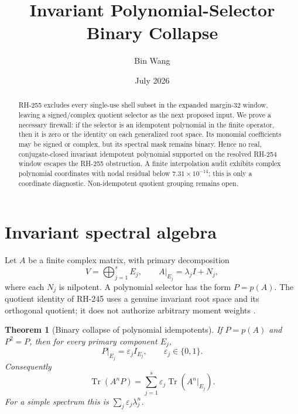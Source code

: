 \documentclass[11pt]{article}
\title{Invariant Polynomial-Selector Binary Collapse}
\author{Bin Wang}
\date{July 2026}
\newtheorem{theorem}{Theorem}[section]
\theoremstyle{remark}
\begin{document}
\maketitle

\begin{abstract}
RH-255 excludes every single-use shell subset in the expanded margin-32
window, leaving a signed/complex quotient selector as the next proposed input.
We prove a necessary firewall: if the selector is an idempotent polynomial in
the finite operator, then it is zero or the identity on each generalized root
space.  Its monomial coefficients may be signed or complex, but its spectral
mask remains binary.  Hence no real, conjugate-closed invariant idempotent
polynomial supported on the resolved RH-254 window escapes the RH-255
obstruction.  A finite interpolation audit exhibits complex polynomial
coordinates with nodal residual below
$7.31\times10^{-14}$; this is only a coordinate diagnostic.  Non-idempotent
quotient grouping remains open.
\end{abstract}

\section{Invariant spectral algebra}

Let $A$ be a finite complex matrix, with primary decomposition
\begin{equation}
 V=\bigoplus_{j=1}^s E_j,
 \qquad A|_{E_j}=\lambda_j I+N_j,
 \label{eq:primary}
\end{equation}
where each $N_j$ is nilpotent.  A polynomial selector has the form $P=p(A)$.
The quotient identity of RH-245 uses a genuine invariant root space and its
orthogonal quotient; it does not authorize arbitrary moment weights
\citep{WangRH245}.

\begin{theorem}[Binary collapse of polynomial idempotents]
\label{thm:collapse}
If $P=p(A)$ and $P^2=P$, then for every primary component $E_j$,
\begin{equation}
 P|_{E_j}=\varepsilon_j I_{E_j},
 \qquad \varepsilon_j\in\{0,1\}.
 \label{eq:binary}
\end{equation}
Consequently
\begin{equation}
 \operatorname{Tr}(A^nP)
 =\sum_{j=1}^s\varepsilon_j\operatorname{Tr}(A^n|_{E_j}).
 \label{eq:trace}
\end{equation}
For a simple spectrum this is $\sum_j\varepsilon_j\lambda_j^n$.
\end{theorem}
\end{document}
